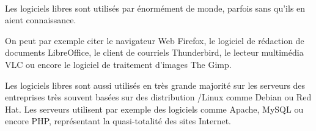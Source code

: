 \begin{minipage}{0.1\textwidth}
\begin{center}
 \\\vspace{1mm}
\vspace{1mm}
\vspace{1mm}
\vspace{1mm}
\end{center}
\end{minipage}
\begin{minipage}{0.75\textwidth}
\begin{multicols}{2}
Les logiciels libres sont utilisés par énormément de monde, parfois sans qu’ils en aient connaissance. 

On peut par exemple citer le navigateur Web \textcolor{Cdl}{Firefox}, le logiciel de rédaction de documents \textcolor{Cdl}{LibreOffice}, le client de courriels \textcolor{Cdl}{Thunderbird}, le lecteur multimédia \textcolor{Cdl}{VLC} ou encore le logiciel de traitement d’images \textcolor{Cdl}{The Gimp}.

Les logiciels libres sont aussi utilisés en très grande majorité sur les serveurs des entreprises très souvent basées sur des distribution /Linux comme \textcolor{Cdl}{Debian} ou \textcolor{Cdl}{Red\,Hat}. Les serveurs utilisent par exemple des logiciels comme \textcolor{Cdl}{Apache}, \textcolor{Cdl}{MySQL} ou encore \textcolor{Cdl}{PHP}, représentant la quasi-totalité des sites Internet.
\end{multicols}
\end{minipage}
\begin{minipage}{0.15\textwidth}
\begin{center}
\vspace{1mm}
\vspace{1mm}
\vspace{1mm}
\vspace{1mm}
\end{center}
\end{minipage}
\vspace*{\baselineskip}
